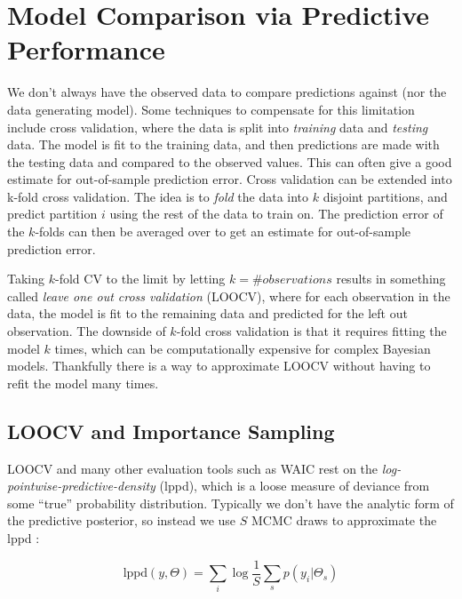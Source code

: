 \documentclass[11pt, oneside, openany]{scrbook}
\begin{document}
\hypertarget{model-comparison-via-predictive-performance}{%
\section{Model Comparison via Predictive Performance}\label{model-comparison-via-predictive-performance}}

We don't always have the observed data to compare predictions against (nor the data generating model). Some techniques to compensate for this limitation include cross validation, where the data is split into \emph{training} data and \emph{testing} data. The model is fit to the training data, and then predictions are made with the testing data and compared to the observed values. This can often give a good estimate for out-of-sample prediction error. Cross validation can be extended into k-fold cross validation. The idea is to \emph{fold} the data into \(k\) disjoint partitions, and predict partition \(i\) using the rest of the data to train on. The prediction error of the \(k\)-folds can then be averaged over to get an estimate for out-of-sample prediction error.

Taking \(k\)-fold CV to the limit by letting \(k = \# observations\) results in something called \emph{leave one out cross validation} (LOOCV), where for each observation in the data, the model is fit to the remaining data and predicted for the left out observation. The downside of \(k\)-fold cross validation is that it requires fitting the model \(k\) times, which can be computationally expensive for complex Bayesian models. Thankfully there is a way to approximate LOOCV without having to refit the model many times.

\hypertarget{loocv-and-importance-sampling}{%
\subsection{LOOCV and Importance Sampling}\label{loocv-and-importance-sampling}}

LOOCV and many other evaluation tools such as WAIC rest on the \emph{log-pointwise-predictive-density} (lppd), which is a loose measure of deviance from some ``true'' probability distribution. Typically we don't have the analytic form of the predictive posterior, so instead we use \(S\) MCMC draws to approximate the lppd \citep{vehtari2017practical}:

\begin{equation}
\mathrm{lppd}(y, \Theta) = \sum_i \log \frac{1}{S} \sum_s p(y_i | \Theta_s)
\label{eq:lppd}
\end{equation}
\end{document}
